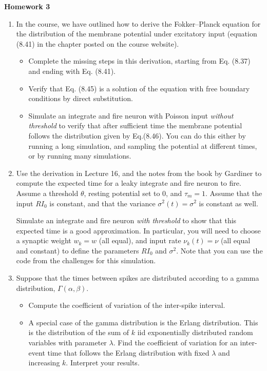 \documentclass[12pt]{article}
\begin{document}
\clearpage

\begin{center}
{\Large \bf Homework 3
\\ \vskip5mm  }
\end{center}

\vskip5mm 

\begin{enumerate}
\item In the course, we  have outlined how to derive the Fokker--Planck equation for the distribution of the membrane potential under 
excitatory input (equation (8.41) in the chapter posted on the course website). 
\begin{itemize}
\item Complete the missing steps in this derivation, starting from Eq. (8.37) and ending with Eq. (8.41).  
\item Verify that Eq. (8.45) is a solution of the equation with free boundary conditions by direct substitution.
\item Simulate an integrate and fire neuron with Poisson input \emph{without threshold} to verify that after sufficient time
the membrane potential follows the distribution given by Eq.(8.46).  You can do this either by running a long simulation, and 
sampling the potential at different times, or by running many simulations.
\end{itemize}

\item Use the derivation in Lecture 16, and the notes from the book by Gardiner to compute the expected time for a
leaky integrate and fire neuron to fire. Assume a threshold $\theta$, resting potential set to 0, and $\tau_m = 1$.
Assume that the input $RI_0$ is constant, and that the variance $\sigma^2(t) = \sigma^2$ is constant as well.  

Simulate an integrate and fire neuron \emph{with threshold} to show that this expected time is a good approximation.
In particular, you will need to choose a synaptic weight $w_k = w$ (all equal), and input rate $\nu_k(t) = \nu$ (all equal and constant)
 to define the parameters $RI_0$ and $\sigma^2$.
Note that you can use the code from the challenges for this simulation. 

\item Suppose that the times between spikes are distributed according to a gamma distribution, $\Gamma(\alpha, \beta)$.  
\begin{itemize}
\item Compute the coefficient of variation of the inter-spike interval. 
\item A special case of the gamma distribution is the Erlang distribution. This is the distribution of the sum of $k$ iid exponentially distributed 
random variables with parameter $\lambda$.  Find the coefficient of variation for 
an inter-event time that follows the Erlang distribution with fixed $\lambda$ and increasing $k$.  Interpret your results.
\end{itemize}


\end{enumerate}
\end{document}
